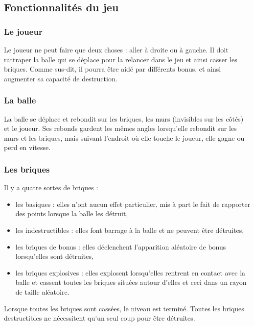 \documentclass[a4paper,10pt]{article}
\begin{document}
\subsection{Fonctionnalités du jeu}
    \subsubsection{Le joueur}
        Le joueur ne peut faire que deux choses : aller à droite ou à gauche. Il doit rattraper la balle
        qui se déplace pour la relancer dans le jeu et ainsi casser les briques. Comme sus-dit, il pourra
        être aidé par différents bonus, et ainsi augmenter sa capacité de destruction.

	\newpage
    \subsubsection{La balle}
        La balle se déplace et rebondit sur les briques, les murs (invisibles sur les côtés) et le joueur.
        Ses rebonds gardent les mêmes angles lorsqu'elle rebondit sur les murs et les briques, mais suivant
        l'endroit où elle touche le joueur, elle gagne ou perd en vitesse.

    \subsubsection{Les briques}
        Il y a quatre sortes de briques :
        \begin{itemize}
            \item les basiques : elles n'ont aucun effet particulier, mis à part le fait de rapporter des points
            lorsque la balle les détruit,
            \item les indestructibles : elles font barrage à la balle et ne peuvent être détruites,
            \item les briques de bonus : elles déclenchent l'apparition aléatoire de bonus lorsqu'elles sont détruites,
            \item les briques explosives : elles explosent lorsqu'elles rentrent en contact avec la balle et cassent
            toutes les briques situées autour d'elles
                    et ceci dans un rayon de taille aléatoire. \\
        \end{itemize}

        Lorsque toutes les briques sont cassées, le niveau est terminé. Toutes les briques destructibles
        ne nécessitent qu'un seul coup pour être détruites.
\end{document}
